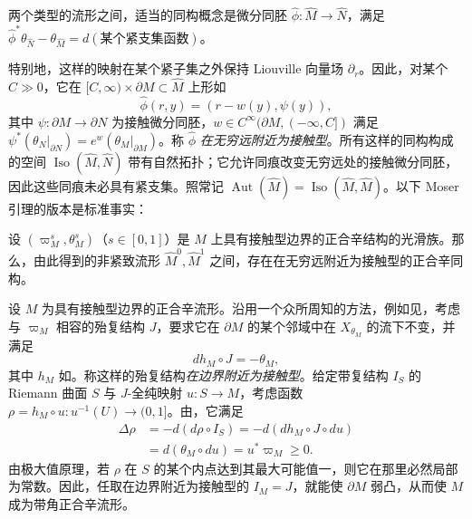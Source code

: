 \begin{definition*}
两个类型的流形之间，适当的同构概念是微分同胚 $\hat\phi:\widehat M\to\widehat N$，满足 $\hat\phi^*\theta_{\widehat N}-\theta_{\widehat M}=d(\text{某个紧支集函数})$。
\end{definition*}
特别地，这样的映射在某个紧子集之外保持 Liouville 向量场 $\partial_r$。因此，对某个 $C\gg0$，它在 $[C,\infty)\times\partial M\subset\widehat M$ 上形如
\[
\hat\phi(r,y)=(r-w(y),\psi(y)),
\]
其中 $\psi:\partial M\to\partial N$ 为接触微分同胚，$w\in C^{\infty}(\partial M,(-\infty,C])$ 满足 $\psi^*(\theta_N|_{\partial N})=e^w(\theta_M|_{\partial M})$。称 $\hat\phi$ \emph{在无穷远附近为接触型}。所有这样的同构构成的空间 $\operatorname{Iso}(\widehat M,\widehat N)$ 带有自然拓扑；它允许同痕改变无穷远处的接触微分同胚，因此这些同痕未必具有紧支集。照常记 $\operatorname{Aut}(\widehat M)=\operatorname{Iso}(\widehat M,\widehat M)$。以下 Moser 引理的版本是标准事实：
\begin{lemma}\label{st:7.2}
设 $(\varpi_M^s,\theta_M^s)$（$s\in[0,1]$）是 $M$ 上具有接触型边界的正合辛结构的光滑族。那么，由此得到的非紧致流形 $\widehat M^0,\widehat M^1$ 之间，存在在无穷远附近为接触型的正合辛同构。
\end{lemma}
设 $M$ 为具有接触型边界的正合辛流形。沿用一个众所周知的方法，例如见，考虑与 $\varpi_M$ 相容的殆复结构 $J$，要求它在 $\partial M$ 的某个邻域中在 $X_{\theta_M}$ 的流下不变，并满足
\begin{equation}\label{eq:7.3}
dh_M\circ J=-\theta_M,
\end{equation}
其中 $h_M$ 如。称这样的殆复结构\emph{在边界附近为接触型}。给定带复结构 $I_S$ 的 Riemann 曲面 $S$ 与 $J$-全纯映射 $u:S\to M$，考虑函数 $\rho=h_M\circ u:u^{-1}(U)\to(0,1]$。由，它满足
\begin{equation}\label{eq:7.4}
\begin{aligned}
\Delta\rho&=-d(d\rho\circ I_S)=-d(dh_M\circ J\circ du)\\
&=d(\theta_M\circ du)=u^*\varpi_M\geq0.
\end{aligned}
\end{equation}
由极大值原理，若 $\rho$ 在 $S$ 的某个内点达到其最大可能值一，则它在那里必然局部为常数。因此，任取在边界附近为接触型的 $I_M=J$，就能使 $\partial M$ 弱凸，从而使 $M$ 成为带角正合辛流形。

